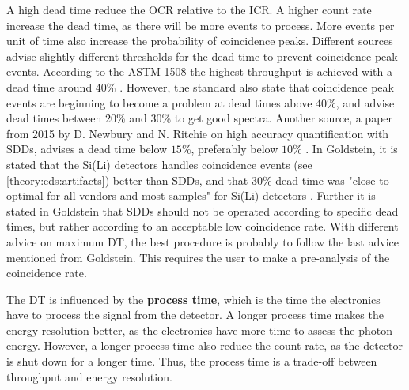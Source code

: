 A high dead time reduce the OCR relative to the ICR.
A higher count rate increase the dead time, as there will be more events to process.
More events per unit of time also increase the probability of coincidence peaks.
Different sources advise slightly different thresholds for the dead time to prevent coincidence peak events.
According to the ASTM 1508 the highest throughput is achieved with a dead time around 40\% \cite{astm_e1508_eds_quantification}.
However, the standard also state that coincidence peak events are beginning to become a problem at dead times above $40$\%, and advise dead times between $20$\% and $30$\% to get good spectra.
Another source, a paper from 2015 by D. Newbury and N. Ritchie on high accuracy quantification with SDDs, advises a dead time below $15$\%, preferably below $10$\% \cite{newbury_deadtime_2014}.
In Goldstein, it is stated that the Si(Li) detectors handles coincidence events (see \cref{theory:eds:artifacts}) better than SDDs, and that $30$\% dead time was "close to optimal for all vendors and most samples" for Si(Li) detectors \cite[p. 466]{goldstein_scanning_2018}.
Further it is stated in Goldstein that SDDs should not be operated according to specific dead times, but rather according to an acceptable low coincidence rate.
With different advice on maximum DT, the best procedure is probably to follow the last advice mentioned from Goldstein.
This requires the user to make a pre-analysis of the coincidence rate.


The DT is influenced by the \textbf{process time}, which is the time the electronics have to process the signal from the detector.
A longer process time makes the energy resolution better, as the electronics have more time to assess the photon energy.
However, a longer process time also reduce the count rate, as the detector is shut down for a longer time.
Thus, the process time is a trade-off between throughput and energy resolution.


